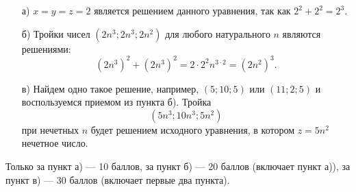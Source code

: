 \solutionSection
\begin{enumerate}
    \item [а)] $x=y=z=2$ является решением данного уравнения, так как $2^{2}+2^{2}=2^{3}$.

    \item [б)]  Тройки чисел $(2n^{3};2n^{3};2n^{2})$ для любого натурального $n$ являются решениями: $$(2n^{3})^{2}+(2n^{3})^{2}=2\cdot2^{2}n^{3\cdot2}=(2n^{2})^{3}.$$

    \item [в)] Найдем одно такое решение, например, $(5;10;5)$ или $(11;2;5)$ и воспользуемся приемом из пункта б). Тройка 
$$
(5n^3;10n^3;5n^2)
$$
при нечетных $n$ будет решением исходного уравнения, в котором $z=5n^2$ нечетное число.
\end{enumerate}

\additionalCriteria 
Только за пункт а) --- 10 баллов, за пункт б) --- 20 баллов (включает пункт а)), за пункт в) --- 30 баллов (включает первые два пункта).


